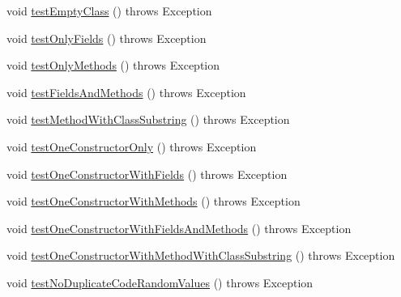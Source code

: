 \begin{DoxyCompactItemize}
void \hyperlink{classedu_1_1illinois_1_1canistelCassabanana_1_1tests_1_1RemoveDuplicateCodeInConstructorsRefactoringTests_a15a8e048be125c3bc2b6b3c075ac8503}{testEmptyClass} ()  throws Exception 
\item 
void \hyperlink{classedu_1_1illinois_1_1canistelCassabanana_1_1tests_1_1RemoveDuplicateCodeInConstructorsRefactoringTests_a804acf9c60fe63b8c96cddd1f5a50d0c}{testOnlyFields} ()  throws Exception 
\item 
void \hyperlink{classedu_1_1illinois_1_1canistelCassabanana_1_1tests_1_1RemoveDuplicateCodeInConstructorsRefactoringTests_aaf2a80565ccea1064625a25fc8094acb}{testOnlyMethods} ()  throws Exception 
\item 
void \hyperlink{classedu_1_1illinois_1_1canistelCassabanana_1_1tests_1_1RemoveDuplicateCodeInConstructorsRefactoringTests_ad3b950b7b16af3f6d42d760606a36041}{testFieldsAndMethods} ()  throws Exception 
\item 
void \hyperlink{classedu_1_1illinois_1_1canistelCassabanana_1_1tests_1_1RemoveDuplicateCodeInConstructorsRefactoringTests_afd3a3614e763667c4cb37a707997dac6}{testMethodWithClassSubstring} ()  throws Exception 
\item 
void \hyperlink{classedu_1_1illinois_1_1canistelCassabanana_1_1tests_1_1RemoveDuplicateCodeInConstructorsRefactoringTests_a0683dc3fda87c48eb477162a3b3f14d9}{testOneConstructorOnly} ()  throws Exception 
\item 
void \hyperlink{classedu_1_1illinois_1_1canistelCassabanana_1_1tests_1_1RemoveDuplicateCodeInConstructorsRefactoringTests_a7a9ac5ccebf5cf024a700db74ca35cc3}{testOneConstructorWithFields} ()  throws Exception 
\item 
void \hyperlink{classedu_1_1illinois_1_1canistelCassabanana_1_1tests_1_1RemoveDuplicateCodeInConstructorsRefactoringTests_ac147b57ed8e9f558920574a84743ddbe}{testOneConstructorWithMethods} ()  throws Exception 
\item 
void \hyperlink{classedu_1_1illinois_1_1canistelCassabanana_1_1tests_1_1RemoveDuplicateCodeInConstructorsRefactoringTests_ad5d877a8c45fc76e2a8ab72b78667a8d}{testOneConstructorWithFieldsAndMethods} ()  throws Exception 
\item 
void \hyperlink{classedu_1_1illinois_1_1canistelCassabanana_1_1tests_1_1RemoveDuplicateCodeInConstructorsRefactoringTests_ab518ec5a01967ba387d226705620c2ce}{testOneConstructorWithMethodWithClassSubstring} ()  throws Exception 
\item 
void \hyperlink{classedu_1_1illinois_1_1canistelCassabanana_1_1tests_1_1RemoveDuplicateCodeInConstructorsRefactoringTests_ab7ed0630acbbb01b36e84e060a282193}{testNoDuplicateCodeRandomValues} ()  throws Exception 

\end{DoxyCompactItemize}
